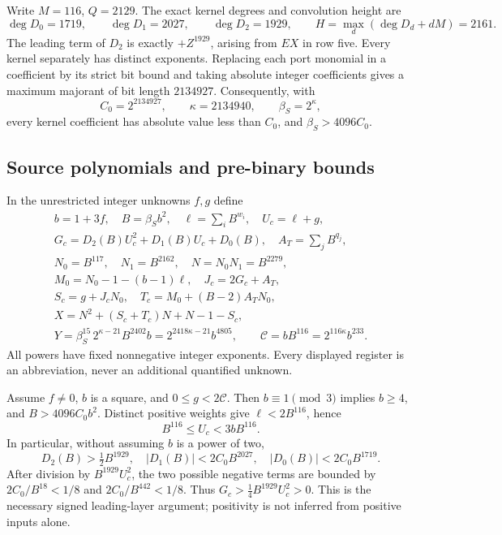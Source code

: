 Write $M=116$, $Q=2129$. The exact kernel degrees and convolution height are
\[
 \deg D_0=1719,\qquad\deg D_1=2027,\qquad\deg D_2=1929,\qquad
 H=\max_d(\deg D_d+dM)=2161.
\]
The leading term of $D_2$ is exactly $+Z^{1929}$, arising from $EX$ in
row five. Every kernel separately has distinct exponents. Replacing each
port monomial in a coefficient by its strict bit bound and taking absolute
integer coefficients gives a maximum majorant of bit length $2134927$.
Consequently, with
\[
 C_0=2^{2134927},\qquad\kappa=2134940,\qquad\beta_S=2^\kappa,
\]
every kernel coefficient has absolute value less than $C_0$, and
$\beta_S>4096C_0$.

\subsection{Source polynomials and pre-binary bounds}

In the unrestricted integer unknowns $f,g$ define
\begin{gather*}
 b=1+3f,\quad B=\beta_S b^2,\quad\ell=\sum_i B^{w_i},\quad U_c=\ell+g,\\
 G_c=D_2(B)U_c^2+D_1(B)U_c+D_0(B),\quad A_T=\sum_j B^{q_j},\\
 N_0=B^{117},\quad N_1=B^{2162},\quad N=N_0N_1=B^{2279},\\
 M_0=N_0-1-(b-1)\ell,\quad J_c=2G_c+A_T,\\
 S_c=g+J_cN_0,\quad T_c=M_0+(B-2)A_TN_0,\\
 X=N^2+(S_c+T_c)N+N-1-S_c,\\
 Y=\beta_S^{15}\,2^{\kappa-21}B^{2402}b
   =2^{2418\kappa-21}b^{4805},\qquad
 \mathcal C=bB^{116}=2^{116\kappa}b^{233}.
\end{gather*}
All powers have fixed nonnegative integer exponents. Every displayed
register is an abbreviation, never an additional quantified unknown.

Assume $f\ne0$, $b$ is a square, and $0\le g<2\mathcal C$.
Then $b\equiv1\pmod3$ implies $b\ge4$, and $B>4096C_0b^2$.
Distinct positive weights give $\ell<2B^{116}$, hence
\[
 B^{116}\le U_c<3bB^{116}.
\]
In particular, without assuming $b$ is a power of two,
\[
 D_2(B)>\tfrac12B^{1929},\quad
 |D_1(B)|<2C_0B^{2027},\quad |D_0(B)|<2C_0B^{1719}.
\]
After division by $B^{1929}U_c^2$, the two possible negative terms
are bounded by $2C_0/B^{18}<1/8$ and $2C_0/B^{442}<1/8$.
Thus $G_c>\tfrac14B^{1929}U_c^2>0$. This is the necessary signed
leading-layer argument; positivity is not inferred from positive inputs
alone.


